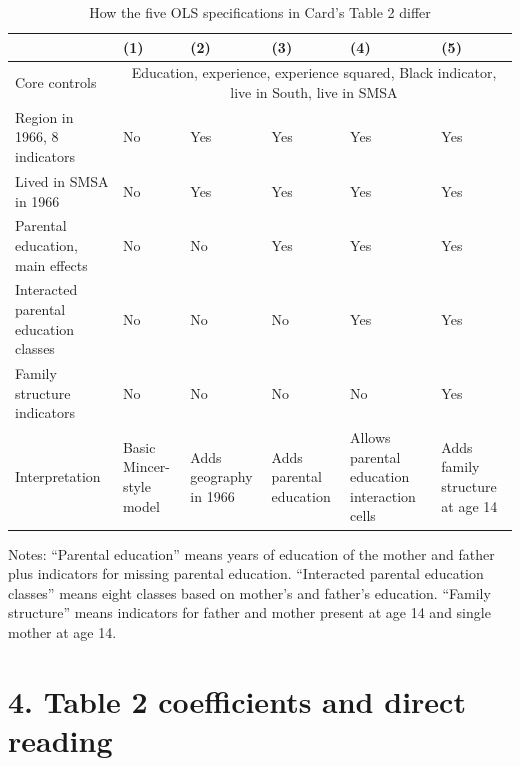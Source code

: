 \documentclass[11pt,a4paper]{article}
\begin{document}
\begin{table}[h!]
\centering
\caption{How the five OLS specifications in Card's Table 2 differ}
\begin{threeparttable}
\small
\begin{tabularx}{\textwidth}{>{\raggedright\arraybackslash}p{2.0cm}XXXXX}
\toprule
 & (1) & (2) & (3) & (4) & (5) \\
\midrule
Core controls & \multicolumn{5}{c}{Education, experience, experience squared, Black indicator, live in South, live in SMSA} \\
Region in 1966, 8 indicators & No & Yes & Yes & Yes & Yes \\
Lived in SMSA in 1966 & No & Yes & Yes & Yes & Yes \\
Parental education, main effects & No & No & Yes & Yes & Yes \\
Interacted parental education classes & No & No & No & Yes & Yes \\
Family structure indicators & No & No & No & No & Yes \\
\midrule
Interpretation & Basic Mincer-style model & Adds geography in 1966 & Adds parental education & Allows parental education interaction cells & Adds family structure at age 14 \\
\bottomrule
\end{tabularx}
\begin{tablenotes}[flushleft]
\footnotesize
\item Notes: ``Parental education'' means years of education of the mother and father plus indicators for missing parental education. ``Interacted parental education classes'' means eight classes based on mother's and father's education. ``Family structure'' means indicators for father and mother present at age 14 and single mother at age 14.
\end{tablenotes}
\end{threeparttable}
\end{table}

\section*{4. Table 2 coefficients and direct reading}
\end{document}
